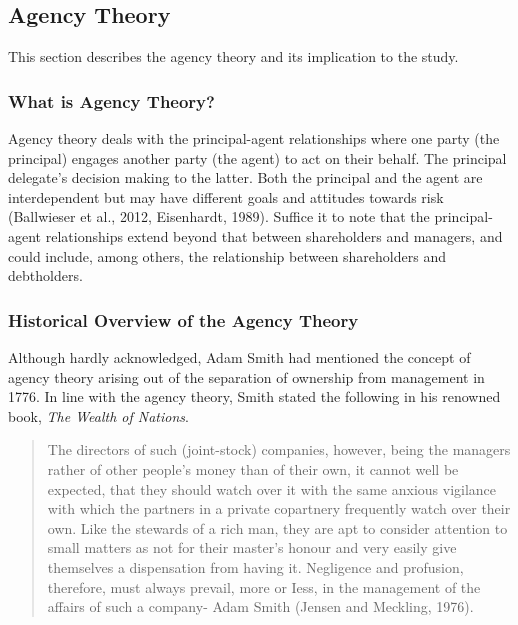 \documentclass[a4paper, nobind]{templates/ociamthesis}
\begin{document}
\hypertarget{agency-theory}{%
\subsection{Agency Theory}\label{agency-theory}}

\noindent This section describes the agency theory and its implication to the study.

\hypertarget{what-is-agency-theory}{%
\subsubsection{What is Agency Theory?}\label{what-is-agency-theory}}

\noindent Agency theory deals with the principal-agent relationships where one party (the principal) engages another party (the agent) to act on their behalf. The principal delegate's decision making to the latter. Both the principal and the agent are interdependent but may have different goals and attitudes towards risk (Ballwieser et al., 2012, Eisenhardt, 1989). Suffice it to note that the principal-agent relationships extend beyond that between shareholders and managers, and could include, among others, the relationship between shareholders and debtholders.

\hypertarget{historical-overview-of-the-agency-theory}{%
\subsubsection{Historical Overview of the Agency Theory}\label{historical-overview-of-the-agency-theory}}

\noindent Although hardly acknowledged, Adam Smith had mentioned the concept of agency theory arising out of the separation of ownership from management in 1776. In line with the agency theory, Smith stated the following in his renowned book, \emph{The Wealth of Nations}.

\begin{quote}
The directors of such (joint-stock) companies, however, being the managers rather of other people's money than of their own, it cannot well be expected, that they should watch over it with the same anxious vigilance with which the partners in a private copartnery frequently watch over their own. Like the stewards of a rich man, they are apt to consider attention to small matters as not for their master's honour and very easily give themselves a dispensation from having it. Negligence and profusion, therefore, must always prevail, more or Iess, in the management of the affairs of such a company- Adam Smith (Jensen and Meckling, 1976).
\end{quote}
\end{document}
